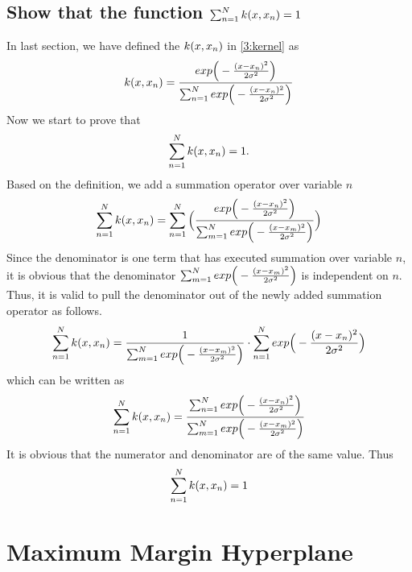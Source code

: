 \documentclass[11pt,a4paper]{article}
\newcommand{\htab}{\hspace*{0.63cm}}
\newcommand{\bs}[1]{\boldsymbol{#1}}
\begin{document}
{\subsection{Show that the function $\sumn k(x,x_{n})= 1$}
\htab In last section, we have defined the $k(x,x_{n})$ in \eqref{3:kernel} as
\begin{align}
    \kx = \frac {\expx}{\sumn \expx } \nonumber 
\end{align}
\htab Now we start to prove that 
\begin{align}
    \sumn \kx = 1.
\end{align}
\htab Based on the definition, we add a summation operator over variable $n$
\begin{align}
    \sumn \kx = \sumn \Big( \frac {\expx}{\summ \expxm } \Big)
    \end{align}
\htab Since the denominator is one term that has executed summation over variable
$n$, it is obvious that the denominator $\sum_{m=1}^{N} exp \Big( - \frac{(x-x_{m})^{2}}{2\sigma^{2}} \Big)$ is independent on $n$. Thus, 
it is valid to pull the denominator out of the newly added summation operator as follows.
\begin{align}
    \sumn \kx = \frac{1}{\summ \expxm} \cdot \sumn \expx
    \end{align}
\htab which can be written as 
\begin{align}
    \sumn \kx = \frac{\sumn \expx}{\summ \expxm} 
    \end{align}
\htab It is obvious that the numerator and denominator are of the same value. Thus
\begin{align}
    \sumn \kx = 1
    \end{align}
\newpage
}
\section{Maximum Margin Hyperplane}
\newcommand{\x}{\bs{x}}
\newcommand{\xo}{\bs{x}_{1}}
\newcommand{\xt}{\bs{x}_{2}}
\newcommand{\xn}{\bs{x}_{n}}
\newcommand{\sumn}{\sum_{n=1}^{N}}
\newcommand{\w}{\bs{w}}
\newcommand{\wt}{\bs{w}^{T}}
\newcommand{\ws}{\bs{w}^{*}}
\newcommand{\margin}{ (\wt \bs{x}_{n} + b )}
\newcommand{\tmargin}{ t_{n} (\wt \bs{x}_{n} + b )}
\newcommand{\tmarginone}{ t_{1} (\wt \bs{x}_{1} + b )}
\newcommand{\tmargintwo}{ t_{2} (\wt \bs{x}_{2} + b )}
\newcommand{\lagg}{\mathcal{L}}
\newcommand{\condition}{ 1 - t_{n} (\wt \xn + b)}
\end{document}
